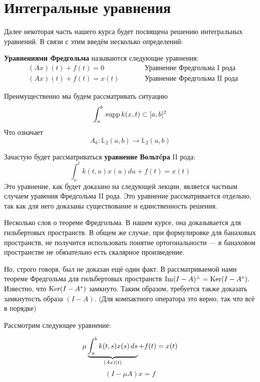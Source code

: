 \documentclass[12pt]{article}
\begin{document}
\section{Интегральные уравнения}

	Далее некоторая часть нашего курса будет посвящена решению интегральных уравнений. В связи с этим введём несколько определений:
	
	\begin{defi}
		\textbf{Уравнениями Фредгольма} называются следующие уравнения:
		\begin{align*}
			&(Ax)(t) + f(t) = 0 &\qquad &\text{Уравнение Фредгольма I рода} \\
			&(Ax)(t) + f(t) = x(t) &\qquad &\text{Уравнение Фредгольма II рода}
		\end{align*}
	\end{defi}
	
	Преимущественно мы будем рассматривать ситуацию 
	$$\int_a^b \,\text{supp}\, k(x,t) \subset [a,b]^2$$
	Что означает
	$$A_k: \mathbb{L}_2(a,b) \rightarrow \mathbb{L}_2(a,b)$$
	
	Зачастую будет рассматриваться \textbf{уравнение Вольт\'eра} II рода:
	$$\int_a^t k(t,u) x(u) du + f(t) = x(t)$$
	Это уравнение, как будет доказано на следующей лекции, является частным случаем уравения Фредгольма 
	II рода. Это уравнение рассматривается отдельно, так как для него доказаны существование и единственность
	решения.


	{\footnotesize
		Несколько слов о теореме Фредгольма. В нашем курсе, она доказывается для гильбертовых пространств.
		В общем же случае, при формулировке для банаховых пространств, не получится использовать понятие
		ортогональности --- в банаховом пространстве не обязательно есть скалярное произведение. \par
		
		Но, строго говоря, был не доказан ещё один факт. В рассматриваемой нами теореме Фредгольма 
		для гильбертовых пространств $\text{Im}(I - A)^{\perp} = \text{Ker}(I - A^*)$. Известно, что $\text{Ker}(I-A^*)$ 
		замкнуто. Таким образом, требуется также доказать замкнутость образа $(I-A)$. (Для компактного
		оператора это верно, так что всё в порядке)
	}
	
	Рассмотрим следующее уравнение:
	
	\begin{equation*}	
		\mu \underbrace{\int_a^b k(t,s) x(s)\,ds}_{(Ax)(t)} + f(t) = x(t) \\		
	\end{equation*}
	\begin{equation}
		(I - \mu A)x = f \label{eq:smallParam}
	\end{equation}
	
\end{document}
